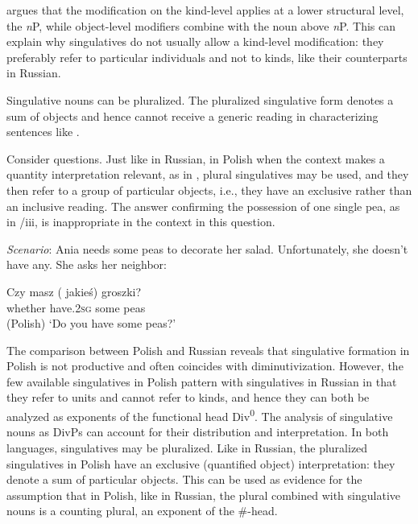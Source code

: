 \documentclass[output=paper,colorlinks,citecolor=brown,
]{langscibook}
\newcommand{\minsp}[1]{#1\hspace{-2pt}} %
\begin{document}
\citet{Wagiel2014} argues that the modification on the kind-level applies at a lower structural level, the \textit{n}P, while object-level modifiers combine with the noun above \textit{n}P. This can explain why singulatives do not usually allow a kind-level modi\-fication: they preferably refer to particular individuals and not to kinds, like their counterparts in Russian. 

Singulative nouns can be pluralized. The pluralized singulative form denotes a sum of objects and hence cannot receive a generic reading in characterizing sentences like .

\label{ex:31}
\z

\noindent Consider questions. Just like in Russian, in Polish when the context makes a quantity interpretation relevant, as in , plural singulatives may be used, and they then refer to a group of particular objects, i.e., they have an exclusive rather than an inclusive reading. The answer confirming the possession of one single pea, as in /iii, is inappropriate in the context in this question.

\eanoraggedright\label{ex:32} \textit{Scenario}: Ania needs some peas to decorate her salad. Unfortunately, she doesn't have any. She asks her neighbor:
\begin{xlist}
\gll Czy masz \minsp{(} jakieś) groszki? \\ 
whether have.\textsc{2sg} {} some peas \\ \hfill (Polish)
\glt `Do you have some peas?' \label{ex:32A:} 
\label{ex:32B}
\end{xlist}
\z

\noindent The comparison between Polish and Russian reveals that singulative formation in Polish is not productive and often coincides with diminutivization. However, the few available singulatives in Polish pattern with singulatives in Russian in that they refer to units and cannot refer to kinds, and hence they can both be analyzed as exponents of the functional head Div\textsuperscript{0}. The analysis of singulative nouns as DivPs can account for their distribution and interpretation. In both languages, singulatives may be pluralized. Like in Russian, the pluralized singulatives in Polish have an exclusive (quantified object) interpretation: they denote a sum of particular objects. This can be used as evidence for the assumption that in Polish, like in Russian, the plural combined with singulative nouns is a counting plural, an exponent of the \#-head. 
\end{document}
